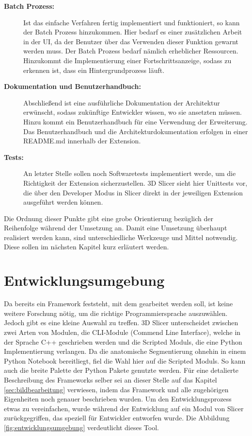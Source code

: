 \begin{description}
	\item[\textbf{Batch Prozess:}] Ist das einfache Verfahren fertig implementiert
		und funktioniert, so kann der Batch Prozess hinzukommen. Hier bedarf es einer
		zusätzlichen Arbeit in der UI, da der Benutzer über das Verwenden dieser
		Funktion gewarnt werden muss. Der Batch Prozess bedarf nämlich erheblicher Ressourcen.
		Hinzukommt die Implementierung einer Fortschrittsanzeige, sodass zu erkennen
		ist, dass ein Hintergrundprozess läuft.

	\item[\textbf{Dokumentation und Benutzerhandbuch:}] Abschließend ist eine ausführliche
		Dokumentation der Architektur erwünscht, sodass zukünftige Entwickler wissen,
		wo sie ansetzten müssen. Hinzu kommt ein Benutzerhandbuch für eine
		Verwendung der Erweiterung. Das Benutzerhandbuch und die Architekturdokumentation
		erfolgen in einer README.md innerhalb der Extension.

	\item[\textbf{Tests:}] An letzter Stelle sollen noch Softwaretests implementiert
		werde, um die Richtigkeit der Extension sicherzustellen. 3D Slicer sieht hier
		Unittests vor, die über den Developer Modus in Slicer direkt in der
		jeweiligen Extension ausgeführt werden können.
\end{description}

Die Ordnung dieser Punkte gibt eine grobe Orientierung bezüglich der Reihenfolge
während der Umsetzung an. Damit eine Umsetzung überhaupt realisiert werden kann,
sind unterschiedliche Werkzeuge und Mittel notwendig. Diese sollen im nächsten
Kapitel kurz erläutert werden.

\section{Entwicklungsumgebung}
Da bereits ein Framework feststeht, mit dem gearbeitet werden soll, ist keine
weitere Forschung nötig, um die richtige Programmiersprache auszuwählen. Jedoch
gibt es eine kleine Auswahl zu treffen. 3D Slicer unterscheidet zwischen zwei Arten
von Modulen, die CLI-Module (Commend Line Interface), welche in der Sprache C++ geschrieben
werden und die Scripted Moduls, die eine Python Implementierung verlangen. Da die
anatomische Segmentierung ohnehin in einem Python Notebook bereitliegt, fiel die
Wahl hier auf die Scripted Moduls. So kann auch die breite Palette der Python Pakete
genutzte werden. Für eine detalierte Beschreibung des Frameworks selber sei an
dieser Stelle auf das Kapitel \ref{sec:bildbearbeitung} verwiesen, indem das Framework
und alle zugehörigen Eigenheiten noch genauer beschrieben wurden. Um den
Entwicklungsprozess etwas zu vereinfachen, wurde während der Entwicklung auf ein
Modul von Slicer zurückgegriffen, das speziell für Entwickler entworfen wurde. Die
Abbildung \ref{fig:entwicklungsumgebung} verdeutlicht dieses Tool.

